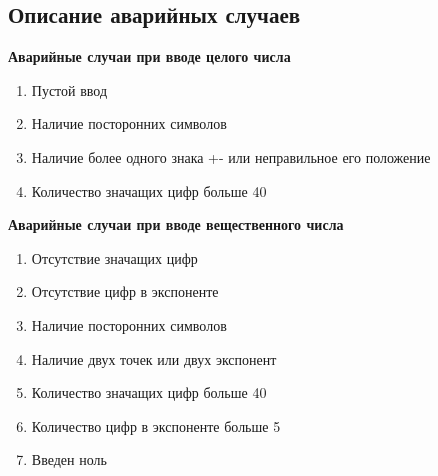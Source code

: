\subsection{Описание аварийных случаев}
	\textbf{Аварийные случаи при вводе целого числа}
	\begin{enumerate}
		\item Пустой ввод
		\item Наличие посторонних символов
		\item Наличие более одного знака +- или неправильное его положение
		\item Количество значащих цифр больше 40
	\end{enumerate}
	\newpage
	\textbf{Аварийные случаи при вводе вещественного числа}
	\begin{enumerate}
		\item Отсутствие значащих цифр
		\item Отсутствие цифр в экспоненте
		\item Наличие посторонних символов 
		\item Наличие двух точек или двух экспонент
		\item Количество значащих цифр больше 40
		\item Количество цифр в экспоненте больше 5
		\item Введен ноль
	\end{enumerate}


